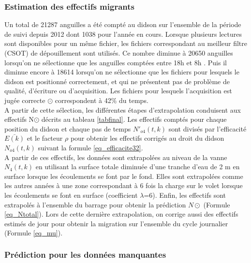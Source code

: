 \documentclass[11pt,twocolumn,titlepage,twoside]{article}
\begin{document}
\subsubsection{Estimation des effectifs migrants}
\label{parestimationodot}


Un total de
\num{21287}
anguilles a été compté au didson sur l'ensemble de la période de suivi depuis
2012 dont \num{1038} pour l'année en cours. Lorsque
plusieurs lectures sont disponibles pour un même fichier, les fichiers correspondant au
meilleur filtre (CSOT) de dépouillement sont utilisés.
Ce nombre diminue à
\num{20650}
anguilles lorsqu'on ne sélectionne que les
anguilles comptées entre 18h et 8h . Puis il diminue encore à
\num{18614}
lorsqu'on ne sélectionne que les fichiers pour lesquels le didson est positionné
correctement, et qui ne présentent pas de problème de qualité, d'écriture ou
d'acquisition. Les fichiers pour lesquels l'acquisition est jugée correcte $\odot$ correspondent
à \num{42}\% du temps.\\
A partir de cette sélection, les différentes étapes d'extrapolation conduisent
aux effectifs N$\odot$ décrits au tableau \ref{tabfinal}. Les effectifs comptés
pour chaque position du didson et chaque pas de temps $N'_{o4}(t,k)$ sont
divisés par l'efficacité $\bar{E(k)}$ et le facteur $\rho$ pour obtenir les effectifs corrigés au droit du didson
$N_{o4}(t,k)$ suivant la formule \ref{eq_efficacite32}.\\
A partir de ces effectifs, les données sont extrapolées au niveau de la vanne
$N_{4}(t,k)$ en utilisant la surface totale diminuée d'une tranche d'eau de 2 m
en surface lorsque les écoulements se font par le fond. Elles sont extrapolées
comme les autres années à une zone correspondant à 6
fois la charge sur le volet lorsque les écoulements se font en surface (coefficient $\lambda$=6).
Enfin, les effectifs sont extrapolés à l'ensemble du barrage pour obtenir la prédiction $N\odot$ (Formule
\ref{eq_Ntotal}). Lors de cette dernière extrapolation, on corrige aussi des
effectifs estimés de jour pour obtenir la migration sur l'ensemble du cycle
journalier (Formule \ref{eq_mu}).
\subsubsection{Prédiction pour les données manquantes}
\end{document}
